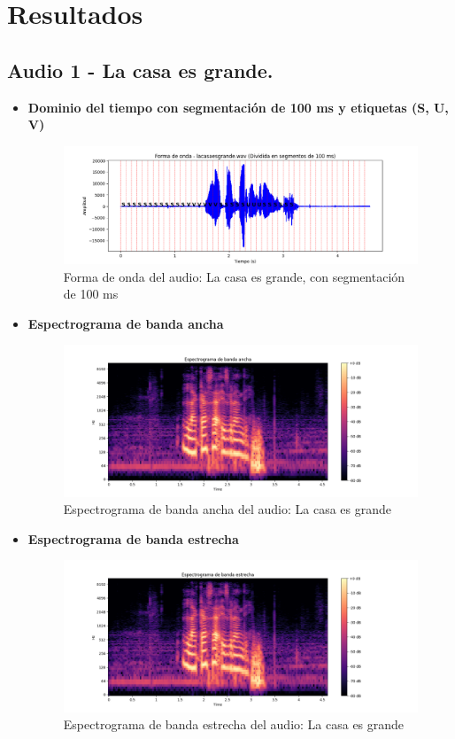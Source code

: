 \documentclass{report}
\begin{document}
\newpage
\section{Resultados}
\subsection{Audio 1 - La casa es grande.}
\begin{itemize}
    \item \textbf{Dominio del tiempo con segmentación de 100 ms y etiquetas (S, U, V)}
    \begin{figure}[h]
        \centering
        \includegraphics[width=\linewidth]{a1.png}
        \caption{Forma de onda del audio: La casa es grande, con segmentación de 100 ms}
        \label{fig:forma_onda_audio1div}
    \end{figure}
    \item \textbf{Espectrograma de banda ancha}
    \begin{figure}[h]
        \centering
        \includegraphics[width=\linewidth]{ancha1.png}
        \caption{Espectrograma de banda ancha del audio: La casa es grande}
        \label{fig:espectograma de banda ancha audio1}
    \end{figure}
    \newpage
    \item \textbf{Espectrograma de banda estrecha}
    \begin{figure}[h]
        \centering
        \includegraphics[width=\linewidth]{estrecha1.png}
        \caption{Espectrograma de banda estrecha del audio: La casa es grande}
        \label{fig:espectograma de banda estrecha audio1}
    \end{figure}
\end{itemize}
\newpage
\end{document}
